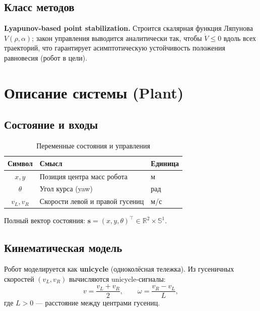 \documentclass[12pt, a4paper]{article}
\newcommand{\R}{\mathbb{R}}
\theoremstyle{definition}
\theoremstyle{plain}
\begin{document}
\subsection{Класс методов}

\textbf{Lyapunov-based point stabilization.}  Строится скалярная функция Ляпунова
$V(\rho, \alpha)$; закон управления выводится аналитически так, чтобы
$\dot{V} \le 0$ вдоль всех траекторий, что гарантирует асимптотическую устойчивость
положения равновесия (робот в цели).

\section{Описание системы (Plant)}\label{sec:system}

\subsection{Состояние и входы}

\begin{table}[H]
\centering
\caption{Переменные состояния и управления}
\begin{tabular}{@{}cll@{}}
\toprule
Символ & Смысл & Единица \\
\midrule
$x, y$       & Позиция центра масс робота       & м \\
$\theta$     & Угол курса (yaw)                  & рад \\
$v_L, v_R$   & Скорости левой и правой гусениц   & м/с \\
\bottomrule
\end{tabular}
\end{table}

Полный вектор состояния: $\mathbf{s} = (x, y, \theta)^\top \in \R^2 \times \mathbb{S}^1$.

\subsection{Кинематическая модель}

Робот моделируется как \textbf{unicycle} (одноколёсная тележка).  Из гусеничных
скоростей $(v_L, v_R)$ вычисляются unicycle-сигналы:
\begin{equation}\label{eq:track2uni}
  v = \frac{v_L + v_R}{2}, \qquad
  \omega = \frac{v_R - v_L}{L},
\end{equation}
где $L > 0$ --- расстояние между центрами гусениц.
\end{document}
